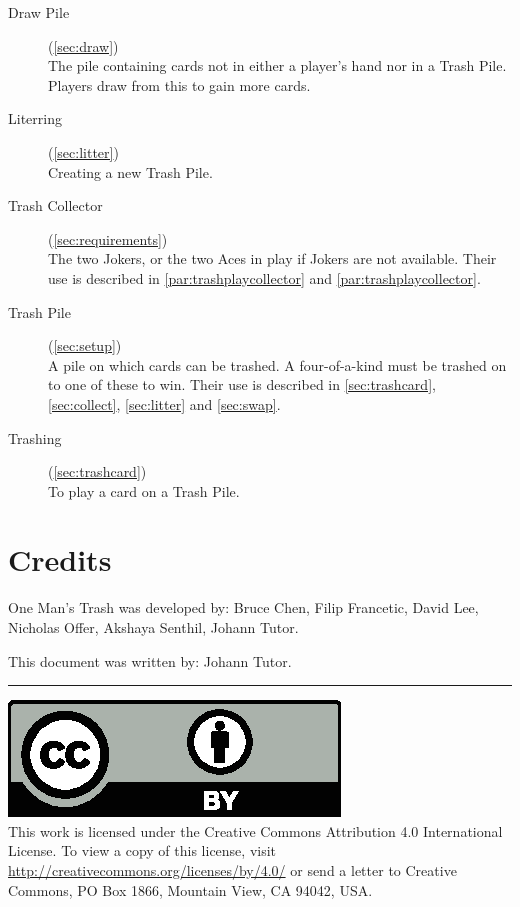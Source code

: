 \documentclass{article}
\newcommand\thegame{One Man's Trash}
\newcommand\copyrightfooter{
  \medskip
  \hrule

  {
    \small
    \includegraphics[scale=0.5]{cc-by.eps}\\
    This work is licensed under the Creative Commons Attribution 4.0
    International License. To view a copy of this license, visit
    \url{http://creativecommons.org/licenses/by/4.0/} or send a letter to Creative Commons, PO Box 1866, Mountain View, CA 94042, USA.
  }
}
\begin{document}
\begin{description}
  \item[Draw Pile] (\autoref{sec:draw})\\
    The pile containing cards not in either a player's hand nor in a Trash Pile. Players draw from this to gain more cards.
  \item[Literring] (\autoref{sec:litter})\\
    Creating a new Trash Pile.
  \item[Trash Collector] (\autoref{sec:requirements})\\
    The two Jokers, or the two Aces in play if Jokers are not available. Their use is described in \autoref{par:trashplaycollector} and \autoref{par:trashplaycollector}.
  \item[Trash Pile] (\autoref{sec:setup})\\
    A pile on which cards can be trashed. A four-of-a-kind must be trashed on to one of these to win. Their use is described in \autoref{sec:trashcard}, \autoref{sec:collect}, \autoref{sec:litter} and \autoref{sec:swap}.
  \item[Trashing] (\autoref{sec:trashcard})\\
    To play a card on a Trash Pile.
\end{description}

\newpage
\section{Credits}
\label{sec:credits}

\thegame{} was developed by:
Bruce Chen,
Filip Francetic,
David Lee,
Nicholas Offer,
Akshaya Senthil,
Johann Tutor.

This document was written by:
Johann Tutor.

\copyrightfooter
\end{document}
